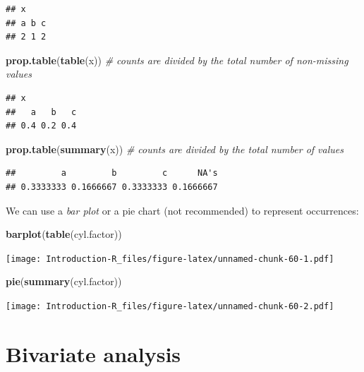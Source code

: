 \documentclass[]{book}
\newenvironment{Shaded}{\begin{snugshade}}{\end{snugshade}}
\newcommand{\CommentTok}[1]{\textcolor[rgb]{0.56,0.35,0.01}{\textit{#1}}}
\newcommand{\KeywordTok}[1]{\textcolor[rgb]{0.13,0.29,0.53}{\textbf{#1}}}
\newcommand{\NormalTok}[1]{#1}
\begin{document}
\begin{verbatim}
## x
## a b c 
## 2 1 2
\end{verbatim}

\begin{Shaded}
\begin{Highlighting}[]
\KeywordTok{prop.table}\NormalTok{(}\KeywordTok{table}\NormalTok{(x)) }\CommentTok{# counts are divided by the total number of non-missing values}
\end{Highlighting}
\end{Shaded}

\begin{verbatim}
## x
##   a   b   c 
## 0.4 0.2 0.4
\end{verbatim}

\begin{Shaded}
\begin{Highlighting}[]
\KeywordTok{prop.table}\NormalTok{(}\KeywordTok{summary}\NormalTok{(x)) }\CommentTok{# counts are divided by the total number of values}
\end{Highlighting}
\end{Shaded}

\begin{verbatim}
##         a         b         c      NA's 
## 0.3333333 0.1666667 0.3333333 0.1666667
\end{verbatim}

We can use a \emph{bar plot} or a pie chart (not recommended) to represent occurrences:

\begin{Shaded}
\begin{Highlighting}[]
\KeywordTok{barplot}\NormalTok{(}\KeywordTok{table}\NormalTok{(cyl.factor))}
\end{Highlighting}
\end{Shaded}

\texttt{[image: Introduction-R\_files/figure-latex/unnamed-chunk-60-1.pdf]}

\begin{Shaded}
\begin{Highlighting}[]
\KeywordTok{pie}\NormalTok{(}\KeywordTok{summary}\NormalTok{(cyl.factor))}
\end{Highlighting}
\end{Shaded}

\texttt{[image: Introduction-R\_files/figure-latex/unnamed-chunk-60-2.pdf]}

\hypertarget{bivariate-analysis}{%
\section{Bivariate analysis}\label{bivariate-analysis}}
\end{document}

